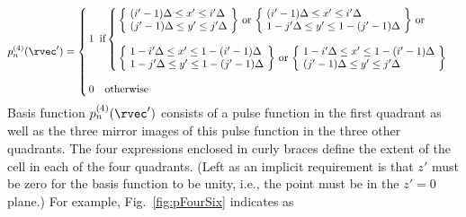 \begin{equation}
  p^{(4)}_n(\rvec') = \left\{
  \begin{array}{l}
    \!\!1 \,\,\, \mbox{if}
    \left\{
      \begin{array}{l}
        \!\!\left\{\!
          \begin{array}{l}
            (i'-1)\Delta \leq x' \leq i'\Delta \\
            (j'-1)\Delta \leq y' \leq j'\Delta \\
          \end{array}
          \!\right\}
        \,\mbox{or}\,
        \left\{\!
        \begin{array}{l}
          (i'-1)\Delta \leq x' \leq i'\Delta \\
          1-j'\Delta \leq y' \leq 1-(j'-1)\Delta \\
        \end{array}
          \!\right\}
        \,\mbox{or} \\
        \\
      \!\!\left\{\!
        \begin{array}{l}
          1-i'\Delta \leq x' \leq 1-(i'-1)\Delta \\
          1-j'\Delta \leq y' \leq 1-(j'-1)\Delta \\
        \end{array}
          \!\right\}
        \,\mbox{or}\,
        \left\{\!
        \begin{array}{l}
          1-i'\Delta \leq x' \leq 1-(i'-1)\Delta \\
          (j'-1)\Delta \leq y' \leq j'\Delta \\
        \end{array}
          \!\right\}
     \end{array}
  \right.\\
    \\
    \!\!0 \quad \mbox{otherwise}
  \end{array}\right.
  \label{eq:pulseFourDetails}
\end{equation}
Basis function $p_n^{(4)}(\rvec')$ consists of a pulse function in the
first quadrant as well as the three mirror images of this pulse
function in the three other quadrants.  The four expressions enclosed
in curly braces define the extent of the cell in each of the four
quadrants.  (Left as an implicit requirement is that $z'$ must be zero
for the basis function to be unity, i.e., the point must be in the
$z'=0$ plane.)  For example, Fig.\ \ref{fig:pFourSix} indicates as
